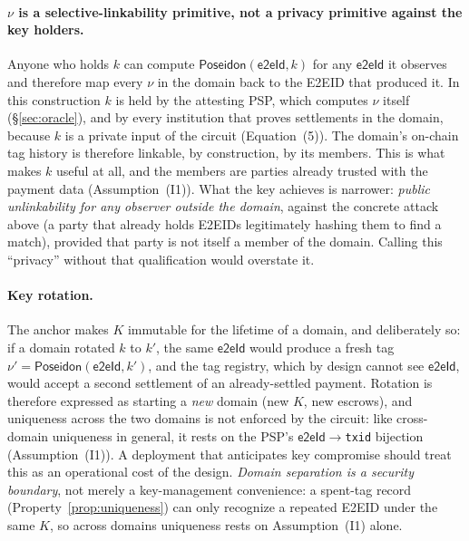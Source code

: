 \documentclass[11pt]{article}
\newcommand{\Poseidon}{\ensuremath{\mathsf{Poseidon}}}
\newcommand{\eeid}{\ensuremath{\mathsf{e2eId}}}
\newcommand{\code}[1]{\texttt{#1}}
\begin{document}
\paragraph{$\nu$ is a selective-linkability primitive, not a privacy primitive
against the key holders.} Anyone who holds $k$ can compute $\Poseidon(\eeid,k)$
for any \eeid{} it observes and therefore map every $\nu$ in the domain back to
the E2EID that produced it. In this construction $k$ is held by the attesting
PSP, which computes $\nu$ itself (\S\ref{sec:oracle}), and by every institution
that proves settlements in the domain, because $k$ is a private input of the
circuit (Equation~(5)). The domain's on-chain tag history is therefore linkable,
by construction, by its members. This is what makes $k$ useful at all, and the
members are parties already trusted with the payment data (Assumption~(I1)).
What the key achieves is narrower: \emph{public unlinkability for any observer
outside the domain}, against the concrete attack above (a party that already
holds E2EIDs legitimately hashing them to find a match), provided that party is
not itself a member of the domain. Calling this ``privacy'' without that
qualification would overstate it.

\paragraph{Key rotation.}
The anchor makes $K$ immutable for the lifetime of a domain, and deliberately
so: if a domain rotated $k$ to $k'$, the same \eeid{} would produce a fresh tag
$\nu'=\Poseidon(\eeid,k')$, and the tag registry, which by design cannot see
\eeid{}, would accept a second settlement of an already-settled payment.
Rotation is therefore expressed as starting a \emph{new} domain (new $K$, new
escrows), and uniqueness across the two domains is not enforced by the circuit:
like cross-domain uniqueness in general, it rests on the PSP's
\eeid{}$\to$\code{txid} bijection (Assumption~(I1)). A deployment that
anticipates key compromise should treat this as an operational cost of the
design. \emph{Domain separation is a security boundary}, not merely a
key-management convenience: a spent-tag record (Property~\ref{prop:uniqueness})
can only recognize a repeated E2EID under the same $K$, so across domains
uniqueness rests on Assumption~(I1) alone.
\end{document}
